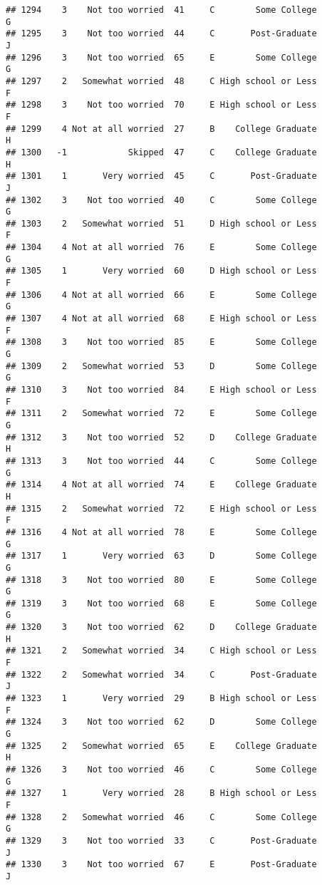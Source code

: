 \documentclass[
]{article}
\begin{document}
\begin{verbatim}
## 1294    3    Not too worried  41     C        Some College         G
## 1295    3    Not too worried  44     C       Post-Graduate         J
## 1296    3    Not too worried  65     E        Some College         G
## 1297    2   Somewhat worried  48     C High school or Less         F
## 1298    3    Not too worried  70     E High school or Less         F
## 1299    4 Not at all worried  27     B    College Graduate         H
## 1300   -1            Skipped  47     C    College Graduate         H
## 1301    1       Very worried  45     C       Post-Graduate         J
## 1302    3    Not too worried  40     C        Some College         G
## 1303    2   Somewhat worried  51     D High school or Less         F
## 1304    4 Not at all worried  76     E        Some College         G
## 1305    1       Very worried  60     D High school or Less         F
## 1306    4 Not at all worried  66     E        Some College         G
## 1307    4 Not at all worried  68     E High school or Less         F
## 1308    3    Not too worried  85     E        Some College         G
## 1309    2   Somewhat worried  53     D        Some College         G
## 1310    3    Not too worried  84     E High school or Less         F
## 1311    2   Somewhat worried  72     E        Some College         G
## 1312    3    Not too worried  52     D    College Graduate         H
## 1313    3    Not too worried  44     C        Some College         G
## 1314    4 Not at all worried  74     E    College Graduate         H
## 1315    2   Somewhat worried  72     E High school or Less         F
## 1316    4 Not at all worried  78     E        Some College         G
## 1317    1       Very worried  63     D        Some College         G
## 1318    3    Not too worried  80     E        Some College         G
## 1319    3    Not too worried  68     E        Some College         G
## 1320    3    Not too worried  62     D    College Graduate         H
## 1321    2   Somewhat worried  34     C High school or Less         F
## 1322    2   Somewhat worried  34     C       Post-Graduate         J
## 1323    1       Very worried  29     B High school or Less         F
## 1324    3    Not too worried  62     D        Some College         G
## 1325    2   Somewhat worried  65     E    College Graduate         H
## 1326    3    Not too worried  46     C        Some College         G
## 1327    1       Very worried  28     B High school or Less         F
## 1328    2   Somewhat worried  46     C        Some College         G
## 1329    3    Not too worried  33     C       Post-Graduate         J
## 1330    3    Not too worried  67     E       Post-Graduate         J

\end{verbatim}
\end{document}
